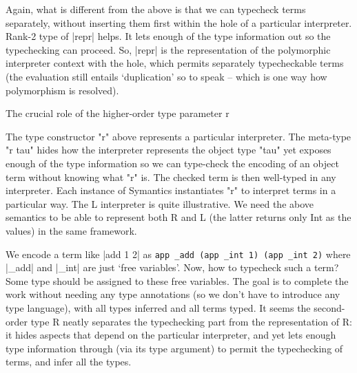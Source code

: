 Again, what is different from the above is that we can
typecheck terms separately, without inserting them first within the
hole of a particular interpreter. Rank-2 type of |repr| helps. It lets
enough of the type information out so the typechecking can
proceed. So, |repr| is the representation of the polymorphic
interpreter context with the hole, which permits separately
typecheckable terms (the evaluation still entails `duplication' so to
speak -- which is one way how polymorphism is resolved).


The crucial role of the higher-order type parameter r

The type constructor "r" above represents a particular interpreter.  The
meta-type "r tau" hides how the interpreter represents the object type
"tau" yet exposes enough of the type information so we can type-check
the encoding of an object term without knowing what "r" is.  The checked
term is then well-typed in any interpreter.  Each instance of Symantics
instantiates "r" to interpret terms in a particular way. The L
interpreter is quite illustrative. We need the above semantics to be
able to represent both R and L (the latter returns only Int as the
values) in the same framework.

We encode a term like |add 1 2| as
\texttt{app \_add (app \_int 1) (app \_int 2)} where |_add| and |_int| are just
`free variables'. Now, how to typecheck such a term? Some type should
be assigned to these free variables. The goal is to complete the work
without needing any type annotations (so we don't have to introduce any
type language), with all types inferred and all terms typed. It seems
the second-order type R neatly separates the typechecking part from
the representation of R: it hides aspects that depend on the
particular interpreter, and yet lets enough type information through
(via its type argument) to permit the typechecking of terms, and infer
all the types. 



